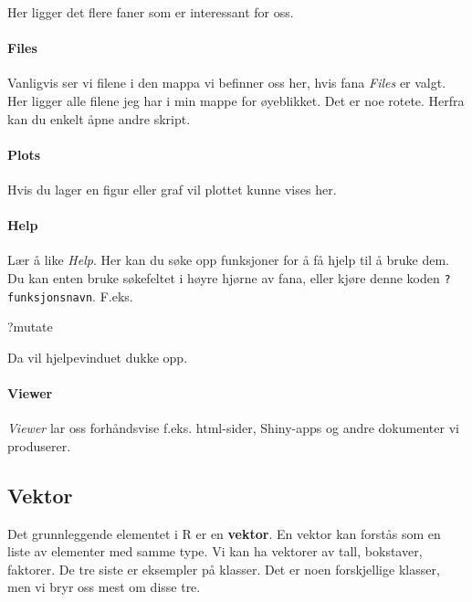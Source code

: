 \documentclass[
  letterpaper,
  DIV=11,
  numbers=noendperiod]{scrartcl}
\let\oldparagraph\paragraph
\renewcommand{\paragraph}[1]{\oldparagraph{#1}\mbox{}}
\newenvironment{Shaded}{\begin{snugshade}}{\end{snugshade}}
\newcommand{\NormalTok}[1]{\textcolor[rgb]{0.00,0.23,0.31}{#1}}
\begin{document}
Her ligger det flere faner som er interessant for oss.

\hypertarget{files}{%
\paragraph{Files}\label{files}}

Vanligvis ser vi filene i den mappa vi befinner oss her, hvis fana
\emph{Files} er valgt. Her ligger alle filene jeg har i min mappe for
øyeblikket. Det er noe rotete. Herfra kan du enkelt åpne andre skript.

\hypertarget{plots}{%
\paragraph{Plots}\label{plots}}

Hvis du lager en figur eller graf vil plottet kunne vises her.

\hypertarget{help}{%
\paragraph{Help}\label{help}}

Lær å like \emph{Help}. Her kan du søke opp funksjoner for å få hjelp
til å bruke dem. Du kan enten bruke søkefeltet i høyre hjørne av fana,
eller kjøre denne koden \texttt{?funksjonsnavn}. F.eks.

\begin{Shaded}
\begin{Highlighting}[]
\NormalTok{?mutate}
\end{Highlighting}
\end{Shaded}

Da vil hjelpevinduet dukke opp.

\hypertarget{viewer}{%
\paragraph{Viewer}\label{viewer}}

\emph{Viewer} lar oss forhåndsvise f.eks. html-sider, Shiny-apps og
andre dokumenter vi produserer.

\hypertarget{vektor}{%
\subsection{Vektor}\label{vektor}}

Det grunnleggende elementet i R er en \textbf{vektor}. En vektor kan
forstås som en liste av elementer med samme type. Vi kan ha vektorer av
tall, bokstaver, faktorer. De tre siste er eksempler på klasser. Det er
noen forskjellige klasser, men vi bryr oss mest om disse tre.
\end{document}
